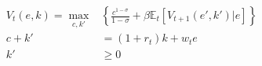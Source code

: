 \begin{align}
    V_t(e, k) = \max_{c, k'} & \left\{\frac{c^{1-\sigma}}{1-\sigma} + \beta \mathbb{E}_t\left[V_{t+1}(e', k')|e \right] \right\}
    \\
    c + k'                   & = (1 + r_t)k + w_t e
    \\
    k'                       & \geq 0
\end{align}
